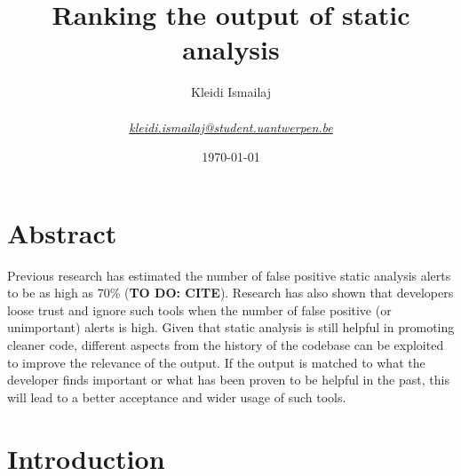 \documentclass{article}
\title{Ranking the output of static analysis}
\author{Kleidi Ismailaj \\ \\ \href{mailto:kleidi.ismailaj@student.uantwerpen.be}
{\textit{kleidi.ismailaj@student.uantwerpen.be}}}
\date{\today}
\begin{document}
\maketitle
\newpage
\tableofcontents
\newpage

\section{Abstract}
Previous research has estimated the number of false positive static analysis alerts to be as high as 70\% (\textbf{TO DO: CITE}). Research has also shown that developers loose trust and ignore such tools when the number of false positive (or unimportant) alerts is high. Given that static analysis is still helpful in promoting cleaner code, different aspects from the history of the codebase can be exploited to improve the relevance of the output. If the output is matched to what the developer finds important or what has been proven to be helpful in the past, this will lead to a better acceptance and wider usage of such tools.



\section{Introduction}

\end{document}
